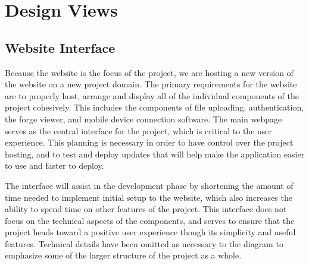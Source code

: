 \documentclass[letterpaper, 10pt, draftclsnofoot, compsoc, onecolumn]{IEEEtran}
\begin{document}
\section{Design Views}
\subsection{Website Interface}
Because the website is the focus of the project, we are hosting a new version of the website on a new project domain. The primary requirements for the website are to properly host, arrange and display all of the individual components of the project cohesively. This includes the components of file uploading, authentication, the forge viewer, and mobile device connection software. The main webpage serves as the central interface for the project, which is critical to the user experience. This planning is necessary in order to have control over the project hosting, and to test and deploy updates that will help make the application easier to use and faster to deploy.

The interface will assist in the development phase by shortening the amount of time needed to implement initial setup to the website, which also increases the ability to spend time on other features of the project. This interface does not focus on the technical aspects of the components, and serves to ensure that the project heads toward a positive user experience though its simplicity and useful features. Technical details have been omitted as necessary to the diagram to emphasize some of the larger structure of the project as a whole. 
\end{document}

